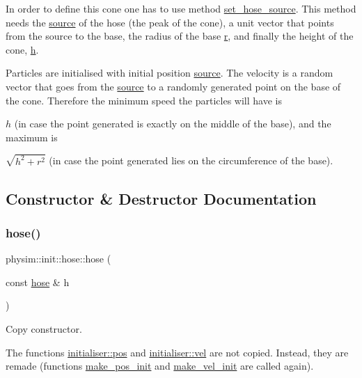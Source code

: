 In order to define this cone one has to use method \hyperlink{classphysim_1_1init_1_1hose_a6f7f673fe4d7a21e850ad09ee27c2651}{set\+\_\+hose\+\_\+source}. This method needs the \hyperlink{classphysim_1_1init_1_1hose_ad0714340c9f5459645dfdc0f51fd0b46}{source} of the hose (the peak of the cone), a unit vector that points from the source to the base, the radius of the base \hyperlink{classphysim_1_1init_1_1hose_a7dd44fc02769dcf88e7ce0fdca49676d}{r}, and finally the height of the cone, \hyperlink{classphysim_1_1init_1_1hose_a31d489427eb8f8db1b702cca637f8551}{h}.

Particles are initialised with initial position \hyperlink{classphysim_1_1init_1_1hose_ad0714340c9f5459645dfdc0f51fd0b46}{source}. The velocity is a random vector that goes from the \hyperlink{classphysim_1_1init_1_1hose_ad0714340c9f5459645dfdc0f51fd0b46}{source} to a randomly generated point on the base of the cone. Therefore the minimum speed the particles will have is
\begin{DoxyItemize}
\item $h$ (in case the point generated is exactly on the middle of the base), and the maximum is
\item $\sqrt{h^2 + r^2}$ (in case the point generated lies on the circumference of the base). 
\end{DoxyItemize}

\subsection{Constructor \& Destructor Documentation}
\mbox{\label{classphysim_1_1init_1_1hose_ad29bc42187059e5d7e16f0e49819f138}} 
\subsubsection{\texorpdfstring{hose()}{hose()}}
{\footnotesize\ttfamily physim\+::init\+::hose\+::hose (\begin{DoxyParamCaption}\item[{const \hyperlink{classphysim_1_1init_1_1hose}{hose} \&}]{h }\end{DoxyParamCaption})}



Copy constructor. 

The functions \hyperlink{classphysim_1_1init_1_1initialiser_a1980105ffaa655858b90a8f3a9368682}{initialiser\+::pos} and \hyperlink{classphysim_1_1init_1_1initialiser_a0e6b1de60df484977b975369b225e89b}{initialiser\+::vel} are not copied. Instead, they are remade (functions \hyperlink{classphysim_1_1init_1_1hose_aa016b0a21281702a41368c8bd0fb5745}{make\+\_\+pos\+\_\+init} and \hyperlink{classphysim_1_1init_1_1hose_a7b5f4309df8149bfb3d81e538e71ef24}{make\+\_\+vel\+\_\+init} are called again). 

